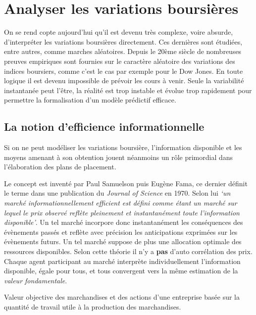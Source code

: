 \documentclass[main.tex]{subfiles}
\begin{document}
\section{Analyser les variations boursières}

On se rend copte aujourd'hui qu'il est devenu très complexe, voire absurde, d'interpréter les variations boursières directement. Ces dernières sont étudiées, entre autres, comme marches aléatoires. Depuis le 20ème siècle de nombreuses preuves empiriques sont fournies sur le caractère aléatoire des variations des indices boursiers, comme c'est le cas par exemple pour le Dow Jones.
En toute logique il est devenu impossible de prévoir les cours à venir. Seule la variabilité instantanée peut l'être, la réalité est trop instable et évolue trop rapidement pour permettre la formalisation d'un modèle prédictif efficace.

\subsection{La notion d'efficience informationnelle}
Si on ne peut modéliser les variations boursière, l'information disponible et les moyens amenant à son obtention jouent néanmoins un rôle primordial dans l'élaboration des plans de placement. 

\begin{definition}
        Le concept est inventé par Paul Samuelson puis Eugène Fama, ce dernier définit le terme dans une publication du \textit{Journal of Science} en 1970. Selon lui \textit{`un marché informationnellement efficient est défini comme étant un marché sur lequel le prix observé reflète pleinement et instantanément toute l'information disponible'}. Un tel marché incorpore donc instantanément les conséquences des évènements passés et reflète avec précision les anticipations exprimées sur les évènements futurs. Un tel marché suppose de plus une allocation optimale des ressources disponibles. Selon cette théorie il n'y a \textbf{pas} d'auto corrélation des prix. Chaque agent participant au marché interprète individuellement l'information disponible, égale pour tous, et tous convergent vers la même estimation de la \emph{valeur fondamentale}.
\end{definition}

\begin{definition}
        Valeur objective des marchandises et des actions d'une entreprise basée sur la quantité de travail utile à la production des marchandises.
\end{definition}
        
\end{document}
